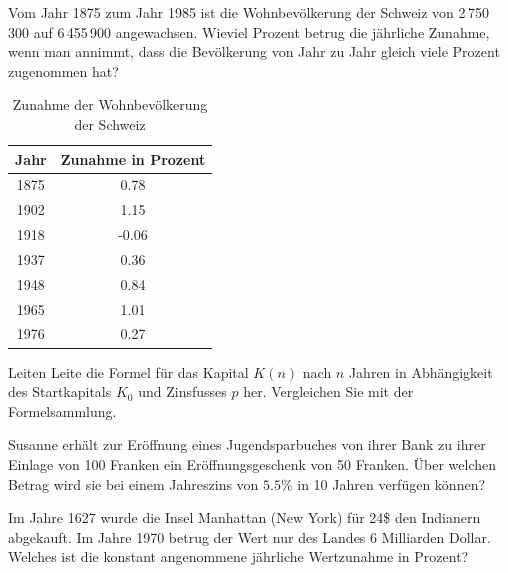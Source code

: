 \documentclass[%
11pt,%
twoside,%
titlepage,%
german,%
headsepline%
]{scrartcl}
\newcommand{\spaltenheight}{\rule{0mm}{3ex}}
\newcommand{\spaltensep}{\\[1ex]}
\begin{document}
\begin{ueb}[Schweiz]
Vom Jahr 1875 zum Jahr 1985 ist die Wohnbevölkerung der Schweiz von 2\,750\,300 auf 6\,455\,900 angewachsen. Wieviel Prozent betrug die jährliche Zunahme, wenn man annimmt, dass die Bevölkerung von Jahr zu Jahr gleich viele Prozent zugenommen hat?
\begin{table}
\small
\begin{center}
\begin{tabular}{|c|c|}
\hline
\rowcolor{Gray}\spaltenheight Jahr & Zunahme in Prozent\spaltensep\hline
\rowcolor{lightyellow}\spaltenheight 1875 & 0.78\spaltensep\hline
\rowcolor{Gray}\spaltenheight 1902 & 1.15\spaltensep\hline
\rowcolor{lightyellow}\spaltenheight 1918 & -0.06\spaltensep\hline
\rowcolor{Gray}\spaltenheight 1937 & 0.36\spaltensep\hline
\rowcolor{lightyellow}\spaltenheight 1948 & 0.84\spaltensep\hline
\rowcolor{Gray}\spaltenheight 1965 & 1.01\spaltensep\hline
\rowcolor{lightyellow}\spaltenheight 1976 & 0.27\spaltensep\hline
\end{tabular}
\end{center}
\normalsize
\caption{Zunahme der Wohnbevölkerung der Schweiz}\label{tab:bevoelkerung}
\end{table}
\end{ueb}

\begin{ueb}[Kapital]
Leiten
Leite die Formel für das Kapital $K(n)$ nach $n$ Jahren in Abhängigkeit des Startkapitals $K_0$ und Zinsfusses $p$ her. Vergleichen Sie mit der Formelsammlung.
\end{ueb}

\begin{ueb}[Susanna]
Susanne erhält zur Eröffnung eines Jugendsparbuches von ihrer Bank zu ihrer Einlage von 100 Franken ein Eröffnungsgeschenk von 50 Franken. Über welchen Betrag wird sie bei einem Jahreszins von $5.5\%$ in 10 Jahren verfügen können?
\end{ueb}

\begin{ueb}[Manhatten]
Im Jahre 1627 wurde die Insel Manhattan (New York) für 24\$ den Indianern abgekauft. Im Jahre 1970 betrug der Wert nur des Landes 6 Milliarden Dollar. Welches ist die konstant angenommene jährliche Wertzunahme in Prozent?
\end{ueb}
\end{document}
